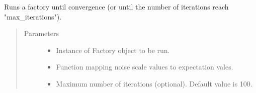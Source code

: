 \documentclass[letterpaper,10pt,english]{sphinxmanual}
\begin{document}
\begin{fulllineitems}
\label{\detokenize{index:mitiq.zne.run_factory}}
Runs a factory until convergence (or until the number of iterations reach "max\_iterations").
\begin{quote}\begin{description}
\item[{Parameters}] \leavevmode\begin{itemize}
\item {} 
 \sphinxhyphen{}\sphinxhyphen{} Instance of Factory object to be run.

\item {} 
 \sphinxhyphen{}\sphinxhyphen{} Function mapping noise scale values to expectation vales.

\item {} 
 \sphinxhyphen{}\sphinxhyphen{} Maximum number of iterations (optional). Default value is 100.

\end{itemize}

\end{description}\end{quote}

\end{fulllineitems}

\end{document}
